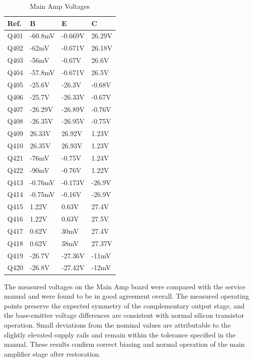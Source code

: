 \documentclass[]{article}
\begin{document}
\begin{table}[H]
	\centering
	\caption{Main Amp Voltages}
	\label{tab:main_amp_voltages}
	\begin{tabular}{|l|l|l|l|}
    \hline
 \textbf{Ref.} & \textbf{B} & \textbf{E} & \textbf{C} \\
    \hline
    Q401 & -60.8mV  & -0.669V  & 26.29V   \\
    \hline
    Q402 & -62mV  & -0.671V   & 26.18V  \\
    \hline
    Q403 & -56mV  &  -0.67V  & 26.6V  \\
    \hline
    Q404 & -57.8mV  & -0.671V  & 26.5V \\   
    \hline
    Q405 & -25.6V  & -26.3V  & -0.68V  \\
    \hline
    Q406 & -25.7V  & -26.33V   & -0.67V   \\
    \hline
    Q407 & -26.29V  &  -26.89V  &  -0.76V \\
    \hline
    Q408 & -26.35V  & -26.95V  &  -0.75V  \\
    \hline
    Q409 & 26.33V  &  26.92V  &  1.23V \\
    \hline
    Q410 & 26.35V  &  26.93V  &  1.23V \\
    \hline
    Q421 & -76mV  &  -0.75V  & 1.24V  \\
    \hline
    Q422 & -90mV  & -0.76V   & 1.22V  \\
    \hline
    Q413 & -0.76mV   &  -0.173V & -26.9V \\
    \hline
    Q414 & -0.75mV  &  -0.16V  & -26.9V  \\
    \hline
    Q415 & 1.22V  &  0.63V  & 27.4V  \\
    \hline
    Q416 & 1.22V   & 0.63V  & 27.5V   \\
    \hline
    Q417 &  0.62V  & 30mV  & 27.4V  \\
    \hline
    Q418 & 0.62V  & 38mV   & 27.37V \\
    \hline
    Q419 & -26.7V  & -27.36V  & -11mV\\
    \hline
    Q420 & -26.8V  & -27.42V & -12mV\\
    \hline
	\end{tabular}
\end{table}

The measured voltages on the Main Amp board were compared with the service manual and were found to be in good agreement overall. The measured operating points preserve the expected symmetry of the complementary output stage, and the base-emitter voltage differences are consistent with normal silicon transistor operation. Small deviations from the nominal values are attributable to the slightly elevated supply rails and remain within the tolerance specified in the manual. These results confirm correct biasing and normal operation of the main amplifier stage after restoration.
\end{document}
